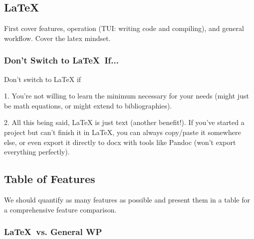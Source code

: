 \documentclass[12pt]{article}
\begin{document}


\subsection{\LaTeX}%
\label{feat-comp.latex}


First cover features, operation (TUI: writing code and compiling), and general workflow. Cover the latex mindset.

\subsubsection{Don't Switch to \LaTeX\ If...}%
\label{feat-comp.latex.don't-switch}

Don't switch to LaTeX if

1. You're not willing to learn the minimum necessary for your needs (might just be math equations, or might extend to bibliographies).

2. All this being said, LaTeX is just text (another benefit!). If you've started a project but can't finish it in LaTeX, you can always copy/paste it somewhere else, or even export it directly to docx with tools like Pandoc (won't export everything perfectly).

\subsection{Table of Features}%
\label{feat-comp.table}

We should quantify as many features as possible and present them in a table for a comprehensive feature comparison.

\subsubsection{\LaTeX\ vs. General WP}%
\label{feat-comp.table.latex-vs-wp}
\end{document}

